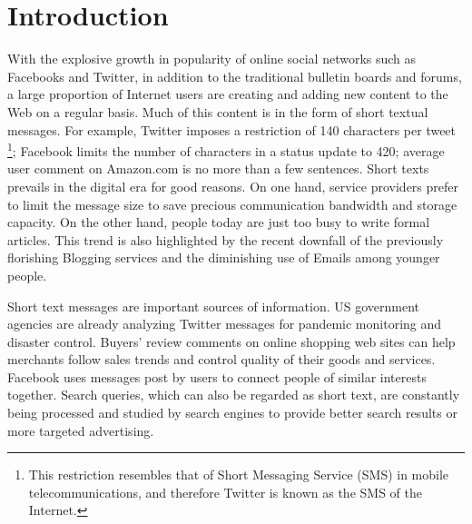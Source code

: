 \section{Introduction}
\label{sec:intro}
With the explosive growth in popularity of online social networks
such as Facebooks and Twitter, in addition to the traditional bulletin boards
and forums, a large proportion of Internet users are creating and adding new 
content to the Web on a regular basis. Much of this content is in the
form of short textual messages. For example, Twitter imposes a restriction
of 140 characters per tweet 
\footnote{This restriction resembles that of Short Messaging Service (SMS) 
in mobile telecommunications, and therefore
Twitter is known as the SMS of the Internet.}; 
Facebook limits the number of characters in
a status update to 420; average user comment on Amazon.com is no more than 
a few sentences. Short texts prevails in the digital era for good reasons.
On one hand, service providers prefer to limit the message size to save
precious communication bandwidth and storage capacity. On the other hand,
people today are just too busy to write formal articles. 
This trend is also highlighted by the recent downfall of the previously
florishing Blogging services and the diminishing 
use of Emails among younger people.

Short text messages are important sources of information. US government
agencies are already analyzing Twitter messages for pandemic monitoring
and disaster control. Buyers' review comments on online shopping web sites 
can help merchants follow sales trends and control quality of their 
goods and services. Facebook uses messages post by users to connect people
of similar interests together. Search queries, which can also be regarded
as short text, are constantly being processed and studied by search engines
to provide better search results or more targeted advertising.


